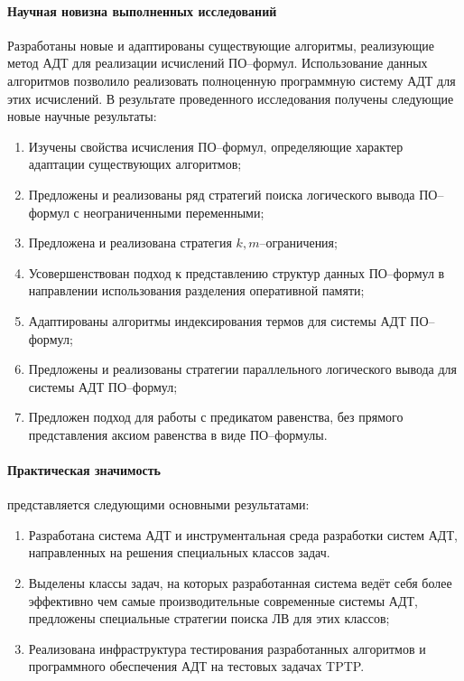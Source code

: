 \paragraph{Научная новизна выполненных исследований}
Разработаны новые и адаптированы существующие алгоритмы, реализующие метод АДТ для реализации исчислений ПО--формул. Использование данных алгоритмов позволило реализовать полноценную программную систему АДТ для этих исчислений. В результате проведенного исследования получены следующие новые научные результаты:
\begin{enumerate}
\item Изучены свойства исчисления ПО--формул, определяющие характер адаптации существующих алгоритмов;
\item Предложены и реализованы ряд стратегий поиска логического вывода ПО--формул с неограниченными переменными;
\item Предложена и реализована стратегия $k,m$--ограничения;
\item Усовершенствован подход к представлению структур данных ПО--формул в направлении использования разделения оперативной памяти;
\item Адаптированы алгоритмы индексирования термов для системы АДТ ПО--формул;
\item Предложены и реализованы стратегии параллельного логического вывода для системы АДТ ПО--формул;
\item Предложен подход для работы с предикатом равенства, без прямого представления аксиом равенства в виде ПО--формулы.
\end{enumerate}

\paragraph{Практическая значимость}\hspace{-1em} представляется следующими основными результатами:
\begin{enumerate}
\item Разработана система АДТ и инструментальная среда разработки систем АДТ, направленных на решения специальных классов задач.
\item Выделены классы задач, на которых разработанная система ведёт себя более эффективно чем самые производительные современные системы АДТ, предложены специальные стратегии поиска ЛВ для этих классов;
\item Реализована инфраструктура тестирования разработанных алгоритмов и программного обеспечения АДТ на тестовых задачах TPTP. %
\end{enumerate}

